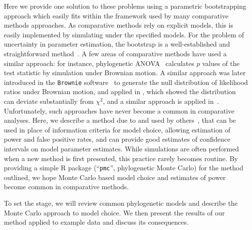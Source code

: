 Here we provide one solution to these problems using a parametric bootstrapping approach 
which easily fits within the framework used by many comparative methods approaches. 
As comparative methods rely on explicit models, this is easily implemented by simulating under the specified models.
For the problem of uncertainty in parameter estimation, the bootstrap is a well-established and straightforward method~\citep{Efron1987}.  
A few areas of comparative methods have used a similar approach:
for instance, phylogenetic ANOVA~\citep{Garland1993} 
calculates $p$ values of the test statistic by simulation under Brownian motion.  
A similar approach was later introduced in the \texttt{Brownie} software~\citep{O'Meara2006}
to generate the null distribution of likelihood ratios under Brownian motion, and applied in
\citet{Revell2008a}, which showed the distribution can deviate substantially from $\chi^2$, 
and a similar approach is applied in~\citet{Revell09}.  
Unfortunately, such approaches have never become a common in comparative analyses.  
Here, we describe a method due to \citet{Cox1962} and used by others~\citep{Goldman1993,Huelsenbeck1996},
that can be used in place of information criteria for model choice,
allowing estimation of power and false positive rates,
and can provide good estimates of confidence intervals on model parameter estimates.  
While simulations are often performed when a new method is first presented, this practice rarely becomes routine.  
By providing a simple R package (``\texttt{pmc}'', phylogenetic Monte Carlo) for the method outlined, 
we hope Monte Carlo based model choice and estimates of power become common in comparative methods.  

To set the stage, we will review common phylogenetic models 
and describe the Monte Carlo approach to model choice.
We then present the results of our method applied to example data and discuss its consequences.  



